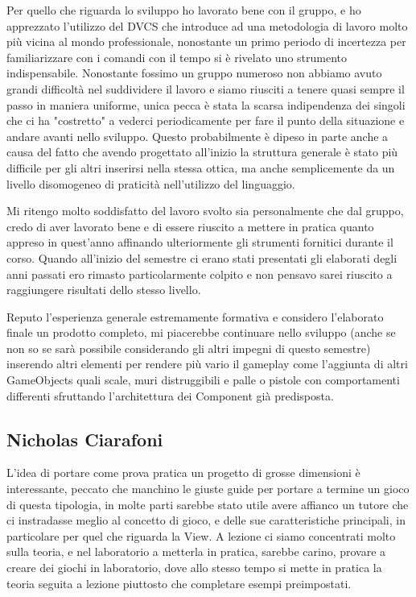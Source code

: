 \documentclass[a4paper,12pt]{report}
\begin{document}
Per quello che riguarda lo sviluppo ho lavorato bene con il gruppo, e ho apprezzato l'utilizzo del DVCS che introduce ad una metodologia di lavoro molto più vicina al mondo professionale, nonostante un primo periodo di incertezza per familiarizzare con i comandi con il tempo si è rivelato uno strumento indispensabile.
Nonostante fossimo un gruppo numeroso non abbiamo avuto grandi difficoltà nel suddividere il lavoro e siamo riusciti a tenere quasi sempre il passo in maniera uniforme, unica pecca è stata la scarsa indipendenza dei singoli che ci ha "costretto" a vederci periodicamente per fare il punto della situazione e andare avanti nello sviluppo. Questo probabilmente è dipeso in parte anche a causa del fatto che avendo progettato all'inizio la struttura generale è stato più difficile per gli altri inserirsi nella stessa ottica, ma anche semplicemente da un livello disomogeneo di praticità nell'utilizzo del linguaggio.

Mi ritengo molto soddisfatto del lavoro svolto sia personalmente che dal gruppo, credo di aver lavorato bene e di essere riuscito a mettere in pratica quanto appreso in quest'anno affinando ulteriormente gli strumenti fornitici durante il corso. Quando all'inizio del semestre ci erano stati presentati gli elaborati degli anni passati ero rimasto particolarmente colpito e non pensavo sarei riuscito a raggiungere risultati dello stesso livello.

Reputo l'esperienza generale estremamente formativa e considero l'elaborato finale un prodotto completo, mi piacerebbe continuare nello sviluppo (anche se non so se sarà possibile considerando gli altri impegni di questo semestre) inserendo altri elementi per rendere più vario il gameplay come l'aggiunta di altri GameObjects quali scale, muri distruggibili e palle o pistole con comportamenti differenti sfruttando l'architettura dei Component già predisposta. 

\subsection*{Nicholas Ciarafoni}
L'idea di portare come prova pratica un progetto di grosse dimensioni è interessante, peccato che manchino le giuste guide per portare a termine un gioco di questa tipologia, in molte parti sarebbe stato utile avere affianco un tutore che ci instradasse meglio al concetto di gioco, e delle sue caratteristiche principali, in particolare per quel che riguarda la View.
A lezione ci siamo concentrati molto sulla teoria, e nel laboratorio a metterla in pratica, sarebbe carino, provare a creare dei giochi in laboratorio, dove allo stesso tempo si mette in pratica la teoria seguita a lezione piuttosto che completare esempi preimpostati.
\end{document}
